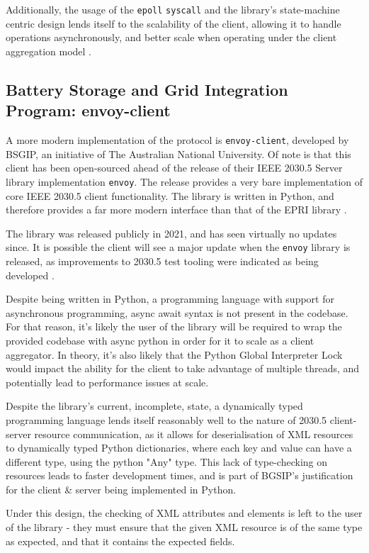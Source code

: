 Additionally, the usage of the \texttt{epoll} \texttt{syscall} and the library's state-machine centric design lends itself to the scalability of the client, allowing it to handle operations asynchronously, and better scale when operating under the client aggregation model \cite[]{eprimanual}. 

\subsection{Battery Storage and Grid Integration Program: envoy-client}
A more modern implementation of the protocol is \texttt{envoy-client}, developed by BSGIP, an initiative of The Australian National University. Of note is that this client has been open-sourced ahead of the release of their IEEE 2030.5 Server library implementation \texttt{envoy}. The release provides a very bare implementation of core IEEE 2030.5 client functionality. The library is written in Python, and therefore provides a far more modern interface than that of the EPRI library \cite{envoyclient}. 

The library was released publicly in 2021, and has seen virtually no updates since. It is possible the client will see a major update when the \texttt{envoy} library is released, as improvements to 2030.5 test tooling were indicated as being developed \cite{DOEAdoption}. 


Despite being written in Python, a programming language with support for asynchronous programming, async await syntax is not present in the codebase. For that reason, it's likely the user of the library will be required to wrap the provided codebase with async python in order for it to scale as a client aggregator. In theory, it's also likely that the Python Global Interpreter Lock would impact the ability for the client to take advantage of multiple threads, and potentially lead to performance issues at scale. 

Despite the library's current, incomplete, state, a dynamically typed programming language lends itself reasonably well to the nature of 2030.5 client-server resource communication, as it allows for deserialisation of XML resources to dynamically typed Python dictionaries, where each key and value can have a different type, using the python "Any" type. This lack of type-checking on resources leads to faster development times, and is part of BGSIP's justification for the client \& server being implemented in Python. 

Under this design, the checking of XML attributes and elements is left to the user of the library - they must ensure that the given XML resource is of the same type as expected, and that it contains the expected fields. 

